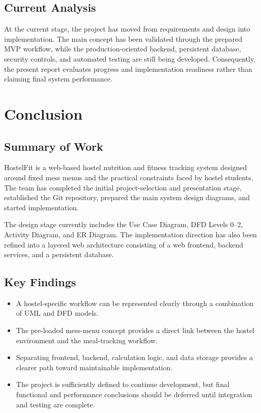 \documentclass[11pt,a4paper]{article}
\begin{document}
\section{Current Analysis}
At the current stage, the project has moved from requirements and design into implementation. The main concept has been validated through the prepared MVP workflow, while the production-oriented backend, persistent database, security controls, and automated testing are still being developed. Consequently, the present report evaluates progress and implementation readiness rather than claiming final system performance.

\chapter{Conclusion}

\section{Summary of Work}
HostelFit is a web-based hostel nutrition and fitness tracking system designed around fixed mess menus and the practical constraints faced by hostel students. The team has completed the initial project-selection and presentation stage, established the Git repository, prepared the main system design diagrams, and started implementation.

The design stage currently includes the Use Case Diagram, DFD Levels 0--2, Activity Diagram, and ER Diagram. The implementation direction has also been refined into a layered web architecture consisting of a web frontend, backend services, and a persistent database.

\section{Key Findings}
\begin{itemize}
    \item A hostel-specific workflow can be represented clearly through a combination of UML and DFD models.
    \item The pre-loaded mess-menu concept provides a direct link between the hostel environment and the meal-tracking workflow.
    \item Separating frontend, backend, calculation logic, and data storage provides a clearer path toward maintainable implementation.
    \item The project is sufficiently defined to continue development, but final functional and performance conclusions should be deferred until integration and testing are complete.
\end{itemize}
\end{document}
